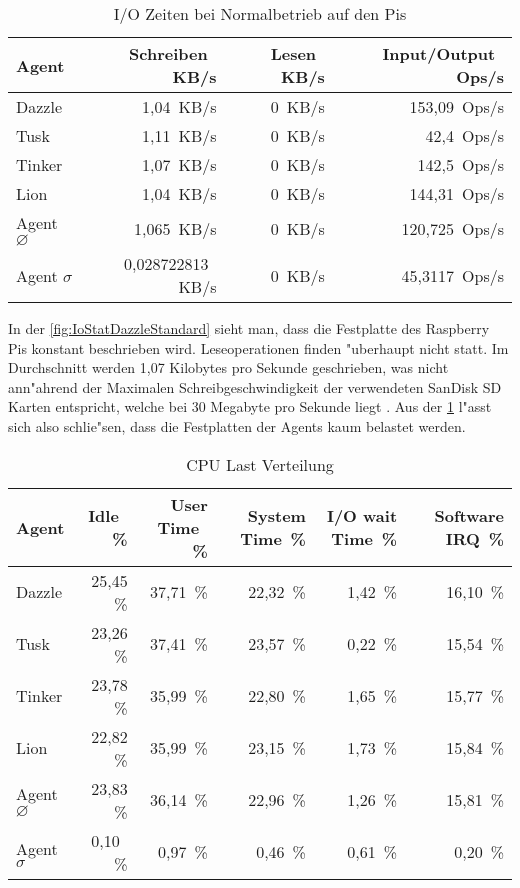 \begin{table}
\centering
\begin{tabular}{l%
 r<{\,KB/s}%
 r<{\,KB/s}%
 r<{\,Ops/s}%
}
Agent	  			& Schreiben	 	& Lesen			& Input/Output 		\\	
\hline
Dazzle 				& 1,04			& 0			& 153,09	        \\
Tusk 				& 1,11			& 0			& 42,4			\\
Tinker				& 1,07 			& 0			& 142,5		 	\\
Lion				& 1,04			& 0			& 144,31	 	\\
Agent $\diameter $  		& 1,065			& 0			& 120,725		\\   
Agent $\sigma $ 		& 0,028722813  		& 0			& 45,3117		\\
\end{tabular}
\caption{I/O Zeiten bei Normalbetrieb auf den Pis}
\label{tab:NormalbetriebIoStat20Mb}
\end{table}


In der \cref{fig:IoStatDazzleStandard} sieht man, dass die Festplatte des Raspberry Pis konstant beschrieben wird. %
Leseoperationen finden "uberhaupt nicht statt. %
Im Durchschnitt werden 1,07 Kilobytes pro Sekunde geschrieben, %
was nicht ann"ahrend der Maximalen Schreibgeschwindigkeit der verwendeten %
SanDisk SD Karten entspricht, welche bei 30 Megabyte pro Sekunde liegt \autocite{san:sd}. %
Aus der \cref{tab:NormalbetriebIoStat20Mb} l"asst sich also schlie"sen, dass die Festplatten der Agents kaum belastet werden. %

\begin{table}
\centering
\begin{tabular}{l%
 r<{\,\%}%
 r<{\,\%}%
 r<{\,\%}%
 r<{\,\%}%
 r<{\,\%}%
}
Agent  				& Idle			& User Time		& System Time		& I/O wait Time	& Software IRQ	\\
\hline
Dazzle 				& 25,45			& 37,71			& 22,32 		& 1,42		& 16,10	\\
Tusk 				& 23,26			& 37,41			& 23,57			& 0,22		& 15,54	\\
Tinker				& 23,78			& 35,99			& 22,80			& 1,65		& 15,77	\\
Lion				& 22,82			& 35,99			& 23,15			& 1,73		& 15,84	\\ 
Agent $\diameter $  		& 23,83			& 36,14			& 22,96			& 1,26	 	& 15,81	\\   
Agent $\sigma $			&  0,10			&  0,97			&  0,46			& 0,61		& 0,20  \\ %
%
\end{tabular}
\caption{CPU Last Verteilung}
\label{tab:CPUlastverteilung20Mb}
\end{table}

